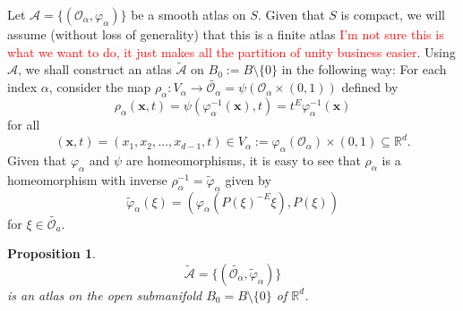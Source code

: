 \documentclass[11pt]{article}
\theoremstyle{theorem}
\newtheorem{proposition}[theorem]{Proposition}
\begin{document}
Let $\mathcal{A}=\{(\mathcal{O}_\alpha,\varphi_{\alpha})\}$ be a smooth atlas on $S$. Given that $S$ is compact, we will assume (without loss of generality) that this is a finite atlas \textcolor{red}{I'm not sure this is what we want to do, it just makes all the partition of unity business easier}. Using $\mathcal{A}$, we shall construct an atlas $\widetilde{\mathcal{A}}$ on $B_0:=B\setminus \{0\}$ in the following way: For each index $\alpha$, consider the map $\rho_{\alpha}:V_\alpha \to \widetilde{\mathcal{O}_\alpha}= \psi(\mathcal{O}_\alpha\times(0,1))$ defined by
\begin{equation*}
\rho_{\alpha}(\mathbf{x},t)=\psi(\varphi_\alpha^{-1}(\mathbf{x}),t)=t^E\varphi^{-1}_{\alpha}(\mathbf{x})
\end{equation*}
for all
\begin{equation*}
(\mathbf{x},t)=(x_1,x_2,\dots,x_{d-1},t)\in V_\alpha:=\varphi_{\alpha}(\mathcal{O}_\alpha)\times (0,1)\subseteq\mathbb{R}^d.
\end{equation*}
Given that $\varphi_\alpha$ and $\psi$ are homeomorphisms, it is easy to see that $\rho_{\alpha}$ is a homeomorphism with inverse $\rho_{\alpha}^{-1}=\widetilde{\varphi}_\alpha$ given by
\begin{equation*}
\widetilde{\varphi}_\alpha(\xi)=(\varphi_{\alpha}(P(\xi)^{-E}\xi),P(\xi))
\end{equation*}
for $\xi\in \widetilde{\mathcal{O}_a}$.
\begin{proposition}
\begin{equation*}
\widetilde{\mathcal{A}}=\{(\widetilde{\mathcal{O}_\alpha},\widetilde{\varphi}_\alpha)\}
\end{equation*}
is an atlas on the open submanifold $B_0=B\setminus\{0\}$ of $\mathbb{R}^d$.
\end{proposition}
\end{document}
